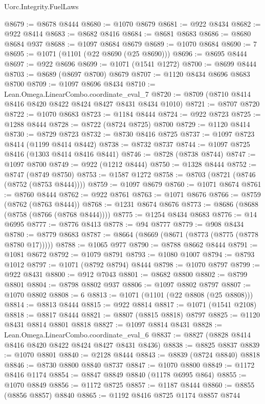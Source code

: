 \begin{lexlean}{Uorc.Integrity.FuelLaws}
\begin{coremodule}
@8679 := @8678 @8444
@8680 := @1070 @8679
@8681 := @922 @8434
@8682 := @922 @8414
@8683 := @8682 @8416
@8684 := @8681 @8683
@8686 := @8680 @8684 @937
@8688 := @1097 @8684 @8679
@8689 := @1070 @8684
@8690 := 7
@8695 := @1071 (@1101 (@22 @8690 (@25 @8690)))
@8696 := @8695 @8444
@8697 := @922 @8696
@8699 := @1071 (@1541 @1272)
@8700 := @8699 @8444
@8703 := @8689 (@8697 @8700) @8679
@8707 := @1120 @8434 @8696 @8683 @8700
@8709 := @1097 @8696 @8434
@8710 := Lean.Omega.LinearCombo.coordinate_eval_7
@8720 := @8709 (@8710 @8414 @8416 @8420 @8422 @8424 @8427 @8431 @8434 @1010)
@8721 := @8707 @8720
@8722 := @1070 @8683
@8723 := @1184 @8444
@8724 := @922 @8723
@8725 := @1288 @8444
@8728 := @8722 (@8724 @8725) @8700
@8729 := @1120 @8414
@8730 := @8729 @8723
@8732 := @8730 @8416 @8725
@8737 := @1097 @8723 @8414 (@1199 @8414 @8442)
@8738 := @8732 @8737
@8744 := @1097 @8725 @8416 (@1303 @8414 @8416 @8441)
@8746 := @8728 (@8738 @8744)
@8747 := @1097 @8700
@8749 := @922 (@1212 @8444)
@8750 := @1328 @8444
@8752 := @8747 (@8749 @8750)
@8753 := @1587 @1272
@8758 := @8703 (@8721 (@8746 (@8752 (@8753 @8444))))
@8759 := @1097 @8679
@8760 := @1071 @8674
@8761 := @8760 @8444
@8762 := @922 @8761
@8763 := @1071 @8676
@8766 := @8759 (@8762 (@8763 @8444))
@8768 := @1231 @8674 @8676
@8773 := @8686 (@8688 (@8758 (@8766 (@8768 @8444))))
@8775 := @1254 @8434 @8683
@8776 := @14 @6995
@8777 := @8776 @8413
@8778 := @94 @8777
@8779 := @908 @8434
@8780 := @8779 @8683
@8787 := @8664 (@8669 (@8671 (@8773 (@8775 (@8778 @8780 @17)))))
@8788 := @1065 @977
@8790 := @8788 @8662 @8444
@8791 := @1081 @8672
@8792 := @1079 @8791
@8793 := @1080 @1007
@8794 := @8793 @1012
@8797 := @1071 (@8792 @8794) @8444
@8798 := @1070 @8797
@8799 := @922 @8431
@8800 := @912 @7043
@8801 := @8682 @8800
@8802 := @8799 @8801
@8804 := @8798 @8802 @937
@8806 := @1097 @8802 @8797
@8807 := @1070 @8802
@8808 := 6
@8813 := @1071 (@1101 (@22 @8808 (@25 @8808)))
@8814 := @8813 @8444
@8815 := @922 @8814
@8817 := @1071 (@1541 @2108)
@8818 := @8817 @8444
@8821 := @8807 (@8815 @8818) @8797
@8825 := @1120 @8431 @8814 @8801 @8818
@8827 := @1097 @8814 @8431
@8828 := Lean.Omega.LinearCombo.coordinate_eval_6
@8837 := @8827 (@8828 @8414 @8416 @8420 @8422 @8424 @8427 @8431 @8436)
@8838 := @8825 @8837
@8839 := @1070 @8801
@8840 := @2128 @8444
@8843 := @8839 (@8724 @8840) @8818
@8846 := @8730 @8800 @8840 @8737
@8847 := @1070 @8800
@8849 := @1172 @8416 @1174
@8854 := @8847 @8849 @8840 (@1178 @6995 @864)
@8855 := @1070 @8849
@8856 := @1172 @8725
@8857 := @1187 @8444
@8860 := @8855 (@8856 @8857) @8840
@8865 := @1192 @8416 @8725 @1174 @8857 @8744

\end{coremodule}
\end{lexlean}
